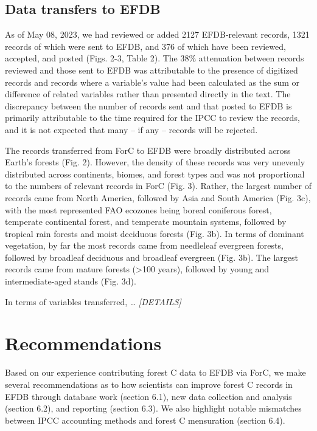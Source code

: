\documentclass[, manuscript]{copernicus}
\begin{document}
\subsection{Data transfers to EFDB}

As of May 08, 2023, we had reviewed or added 2127 EFDB-relevant records,
1321 records of which were sent to EFDB, and 376 of which have been
reviewed, accepted, and posted (Figs. 2-3, Table 2). The 38\%
attenuation between records reviewed and those sent to EFDB was
attributable to the presence of digitized records and records where a
variable's value had been calculated as the sum or difference of related
variables rather than presented directly in the text. The discrepancy
between the number of records sent and that posted to EFDB is primarily
attributable to the time required for the IPCC to review the records,
and it is not expected that many -- if any -- records will be rejected.

The records transferred from ForC to EFDB were broadly distributed
across Earth's forests (Fig. 2). However, the density of these records
was very unevenly distributed across continents, biomes, and forest
types and was not proportional to the numbers of relevant records in
ForC (Fig. 3). Rather, the largest number of records came from North
America, followed by Asia and South America (Fig. 3c), with the most
represented FAO ecozones being boreal coniferous forest, temperate
continental forest, and temperate mountain systems, followed by tropical
rain forests and moist deciduous forests (Fig. 3b). In terms of dominant
vegetation, by far the most records came from needleleaf evergreen
forests, followed by broadleaf deciduous and broadleaf evergreen (Fig.
3b). The largest records came from mature forests (\textgreater100
years), followed by young and intermediate-aged stands (Fig. 3d).

In terms of variables transferred, \ldots{} \emph{{[}DETAILS{]}}

\section{Recommendations}

Based on our experience contributing forest C data to EFDB via ForC, we
make several recommendations as to how scientists can improve forest C
records in EFDB through database work (section 6.1), new data collection
and analysis (section 6.2), and reporting (section 6.3). We also
highlight notable mismatches between IPCC accounting methods and forest
C mensuration (section 6.4).
\end{document}
